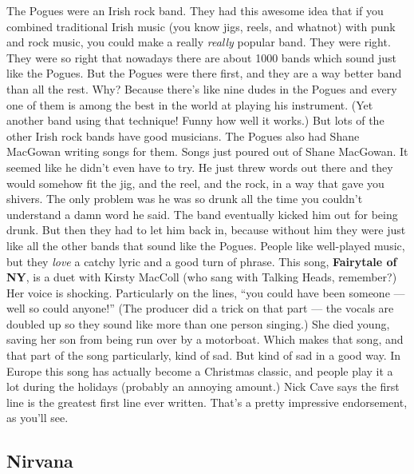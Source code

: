 \documentclass[letterpaper,]{article}
\begin{document}
The Pogues were an Irish rock band. They had this awesome idea that if
you combined traditional Irish music (you know jigs, reels, and whatnot)
with punk and rock music, you could make a really \emph{really} popular
band. They were right. They were so right that nowadays there are about
1000 bands which sound just like the Pogues. But the Pogues were there
first, and they are a way better band than all the rest. Why? Because
there's like nine dudes in the Pogues and every one of them is among the
best in the world at playing his instrument. (Yet another band using
that technique! Funny how well it works.) But lots of the other Irish
rock bands have good musicians. The Pogues also had Shane MacGowan
writing songs for them. Songs just poured out of Shane MacGowan. It
seemed like he didn't even have to try. He just threw words out there
and they would somehow fit the jig, and the reel, and the rock, in a way
that gave you shivers. The only problem was he was so drunk all the time
you couldn't understand a damn word he said. The band eventually kicked
him out for being drunk. But then they had to let him back in, because
without him they were just like all the other bands that sound like the
Pogues. People like well-played music, but they \emph{love} a catchy
lyric and a good turn of phrase. This song, \textbf{Fairytale of NY}, is
a duet with Kirsty MacColl (who sang with Talking Heads, remember?) Her
voice is shocking. Particularly on the lines, ``you could have been
someone --- well so could anyone!'' (The producer did a trick on that
part --- the vocals are doubled up so they sound like more than one
person singing.) She died young, saving her son from being run over by a
motorboat. Which makes that song, and that part of the song
particularly, kind of sad. But kind of sad in a good way. In Europe this
song has actually become a Christmas classic, and people play it a lot
during the holidays (probably an annoying amount.) Nick Cave says the
first line is the greatest first line ever written. That's a pretty
impressive endorsement, as you'll see.

\hypertarget{nirvana}{%
\subsection{Nirvana}\label{nirvana}}
\end{document}

